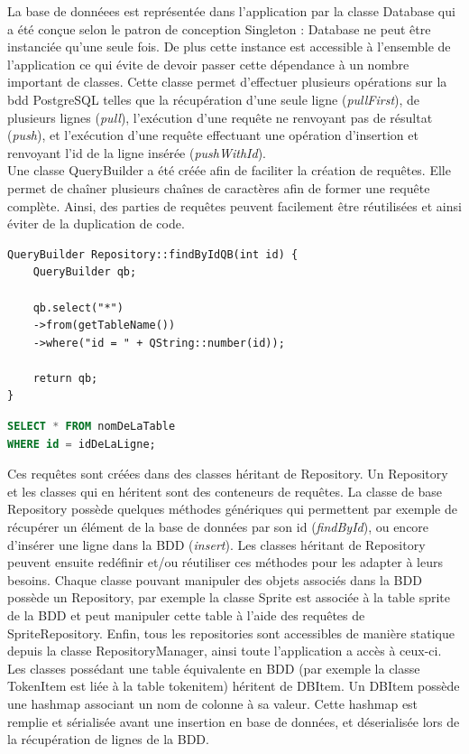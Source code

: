 La base de donnéees est représentée dans l'application par la classe Database qui a été conçue selon le patron de conception Singleton : Database ne peut être instanciée qu'une seule fois. De plus cette instance est accessible à l'ensemble de l'application ce qui évite de devoir passer cette dépendance à un nombre important de classes. Cette classe permet d'effectuer plusieurs opérations sur la bdd PostgreSQL telles que la récupération d'une seule ligne (\emph{pullFirst}), de plusieurs lignes (\emph{pull}), l'exécution d'une requête ne renvoyant pas de résultat (\emph{push}), et l'exécution d'une requête effectuant une opération d'insertion et renvoyant l'id de la ligne insérée (\emph{pushWithId}).\\

Une classe QueryBuilder a été créée afin de faciliter la création de requêtes. Elle permet de chaîner plusieurs chaînes de caractères afin de former une requête complète. Ainsi, des parties de requêtes peuvent facilement être réutilisées et ainsi éviter de la duplication de code.

\begin{lstlisting}[caption=Exemple d'utilisation de QueryBuilder]
QueryBuilder Repository::findByIdQB(int id) {
    QueryBuilder qb;

    qb.select("*")
    ->from(getTableName())
    ->where("id = " + QString::number(id));

    return qb;
}
\end{lstlisting}

\begin{lstlisting}[language=SQL,caption=Equivalent en SQL de la requête créée avec le QueryBuilder]
SELECT * FROM nomDeLaTable 
WHERE id = idDeLaLigne;
\end{lstlisting}

Ces requêtes sont créées dans des classes héritant de Repository. Un Repository et les classes qui en héritent sont des conteneurs de requêtes. La classe de base Repository possède quelques méthodes génériques qui permettent par exemple de récupérer un élément de la base de données par son id (\emph{findById}), ou encore d'insérer une ligne dans la BDD (\emph{insert}). Les classes héritant de Repository peuvent ensuite redéfinir et/ou réutiliser ces méthodes pour les adapter à leurs besoins. Chaque classe pouvant manipuler des objets associés dans la BDD possède un Repository, par exemple la classe Sprite est associée à la table sprite de la BDD et peut manipuler cette table à l'aide des requêtes de SpriteRepository. Enfin, tous les repositories sont accessibles de manière statique depuis la classe RepositoryManager, ainsi toute l'application a accès à ceux-ci.\\

Les classes possédant une table équivalente en BDD (par exemple la classe TokenItem est liée à la table tokenitem) héritent de DBItem. Un DBItem possède une hashmap associant un nom de colonne à sa valeur. Cette hashmap est remplie et sérialisée avant une insertion en base de données, et déserialisée lors de la récupération de lignes de la BDD.